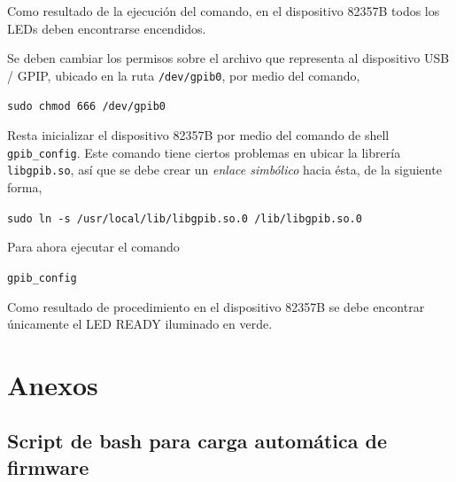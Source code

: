 \documentclass[paper=letter,oneside,fontsize=11pt, parskip=full]{scrartcl}
\begin{document}
		Como resultado de la ejecución del comando, en el dispositivo 82357B todos los LEDs deben encontrarse encendidos.		
		
		Se deben cambiar los permisos sobre el archivo que representa al dispositivo USB / GPIP, ubicado en la ruta \texttt{/dev/gpib0}, por medio del comando,
		
		\texttt{sudo chmod 666 /dev/gpib0}
		
		Resta inicializar el dispositivo 82357B por medio del comando de shell \texttt{gpib\_config}. Este comando tiene ciertos problemas en ubicar la librería \texttt{libgpib.so}, así que se debe crear un \emph{enlace simbólico} hacia ésta, de la siguiente forma,
		
		\texttt{sudo ln -s /usr/local/lib/libgpib.so.0 /lib/libgpib.so.0}
		
		Para ahora ejecutar el comando
			
		\begin{ttfamily}
			\texttt{gpib\_config}
		\end{ttfamily}

	
		Como resultado de procedimiento en el dispositivo 82357B se debe encontrar únicamente el LED READY iluminado en verde.
	
	\section{Anexos}	
		
	\subsection{Script de bash para carga automática de firmware}
	
\end{document}
